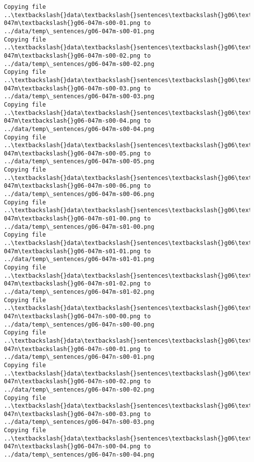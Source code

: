 \documentclass[11pt]{article}
\begin{document}
\begin{Verbatim}[commandchars=\\\{\}]
Copying file ..\textbackslash{}data\textbackslash{}sentences\textbackslash{}g06\textbackslash{}g06-047m\textbackslash{}g06-047m-s00-01.png to
../data/temp\_sentences/g06-047m-s00-01.png
Copying file ..\textbackslash{}data\textbackslash{}sentences\textbackslash{}g06\textbackslash{}g06-047m\textbackslash{}g06-047m-s00-02.png to
../data/temp\_sentences/g06-047m-s00-02.png
Copying file ..\textbackslash{}data\textbackslash{}sentences\textbackslash{}g06\textbackslash{}g06-047m\textbackslash{}g06-047m-s00-03.png to
../data/temp\_sentences/g06-047m-s00-03.png
Copying file ..\textbackslash{}data\textbackslash{}sentences\textbackslash{}g06\textbackslash{}g06-047m\textbackslash{}g06-047m-s00-04.png to
../data/temp\_sentences/g06-047m-s00-04.png
Copying file ..\textbackslash{}data\textbackslash{}sentences\textbackslash{}g06\textbackslash{}g06-047m\textbackslash{}g06-047m-s00-05.png to
../data/temp\_sentences/g06-047m-s00-05.png
Copying file ..\textbackslash{}data\textbackslash{}sentences\textbackslash{}g06\textbackslash{}g06-047m\textbackslash{}g06-047m-s00-06.png to
../data/temp\_sentences/g06-047m-s00-06.png
Copying file ..\textbackslash{}data\textbackslash{}sentences\textbackslash{}g06\textbackslash{}g06-047m\textbackslash{}g06-047m-s01-00.png to
../data/temp\_sentences/g06-047m-s01-00.png
Copying file ..\textbackslash{}data\textbackslash{}sentences\textbackslash{}g06\textbackslash{}g06-047m\textbackslash{}g06-047m-s01-01.png to
../data/temp\_sentences/g06-047m-s01-01.png
Copying file ..\textbackslash{}data\textbackslash{}sentences\textbackslash{}g06\textbackslash{}g06-047m\textbackslash{}g06-047m-s01-02.png to
../data/temp\_sentences/g06-047m-s01-02.png
Copying file ..\textbackslash{}data\textbackslash{}sentences\textbackslash{}g06\textbackslash{}g06-047n\textbackslash{}g06-047n-s00-00.png to
../data/temp\_sentences/g06-047n-s00-00.png
Copying file ..\textbackslash{}data\textbackslash{}sentences\textbackslash{}g06\textbackslash{}g06-047n\textbackslash{}g06-047n-s00-01.png to
../data/temp\_sentences/g06-047n-s00-01.png
Copying file ..\textbackslash{}data\textbackslash{}sentences\textbackslash{}g06\textbackslash{}g06-047n\textbackslash{}g06-047n-s00-02.png to
../data/temp\_sentences/g06-047n-s00-02.png
Copying file ..\textbackslash{}data\textbackslash{}sentences\textbackslash{}g06\textbackslash{}g06-047n\textbackslash{}g06-047n-s00-03.png to
../data/temp\_sentences/g06-047n-s00-03.png
Copying file ..\textbackslash{}data\textbackslash{}sentences\textbackslash{}g06\textbackslash{}g06-047n\textbackslash{}g06-047n-s00-04.png to
../data/temp\_sentences/g06-047n-s00-04.png

\end{Verbatim}
\end{document}
